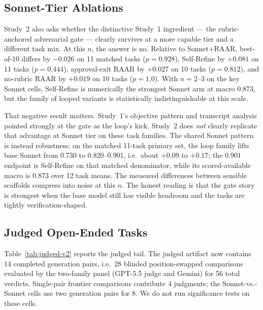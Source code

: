 \documentclass[journal]{IEEEtran}
\newcommand{\method}{RAAR}
\newcommand{\gptjudge}{GPT-5.5 judge}
\begin{document}
\subsection{Sonnet-Tier Ablations}
Study~2 also asks whether the distinctive Study~1 ingredient --- the
rubric-anchored adversarial gate --- clearly survives at a more capable tier
and a different task mix. At this $n$, the answer is no. Relative to
Sonnet+\method{}, best-of-10 differs by $-0.026$ on 11 matched tasks
($p{=}0.928$), Self-Refine by $+0.081$ on 11 tasks ($p{=}0.444$),
approval-exit \method{} by $+0.027$ on 10 tasks ($p{=}0.812$), and
no-rubric \method{} by $+0.019$ on 10 tasks ($p{=}1.0$). With $n{=}2$--3
on the key Sonnet cells, Self-Refine is numerically the strongest Sonnet arm
at macro 0.873, but the family of looped variants is statistically
indistinguishable at this scale.

That negative result matters. Study~1's objective pattern and transcript
analysis pointed strongly at the gate as the loop's kick. Study~2 does
\emph{not} clearly replicate that advantage at Sonnet tier on these task
families. The shared Sonnet pattern is instead robustness: on the matched
11-task primary set, the loop family lifts base Sonnet from 0.730 to
0.820--0.901, i.e.\ about $+0.09$ to $+0.17$; the 0.901 endpoint is
Self-Refine on that matched denominator, while its scored-available macro is
0.873 over 12 task means. The measured differences between sensible
scaffolds compress into noise at this $n$. The honest reading is that the
gate story is strongest when the base model still has visible headroom and
the tasks are tightly verification-shaped.

\subsection{Judged Open-Ended Tasks}
\label{sec:study2-judged}
Table~\ref{tab:judged-v2} reports the judged tail. The judged artifact now
contains 14 completed generation pairs, i.e.\ 28 blinded position-swapped
comparisons evaluated by the two-family panel (\gptjudge{} and Gemini) for 56
total verdicts. Single-pair frontier comparisons contribute 4 judgments;
the Sonnet-vs.-Sonnet cells use two generation pairs for 8. We do not run
significance tests on these cells.
\end{document}
